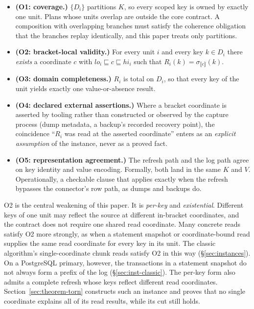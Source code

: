\documentclass[sigconf,nonacm,10pt]{acmart}
\theoremstyle{plain}
\theoremstyle{definition}
\newcommand{\den}[1]{\llbracket #1 \rrbracket}   %
\newcommand{\pre}{\sqsubseteq}                   %
\newcommand{\keys}{K}                            %
\newcommand{\vals}{V}                            %
\begin{document}
\begin{itemize}
\item \textbf{(O1: coverage.)} $\{D_i\}$ partitions $\keys$,
so every scoped key is owned by exactly one unit. Plans whose units
overlap are outside the core contract. A composition with
overlapping branches must satisfy the coherence obligation that the
branches replay identically, and this paper treats only partitions.
\item \textbf{(O2: bracket-local validity.)} For every unit $i$
and every key $k \in D_i$ there \emph{exists} a coordinate $c$ with
$lo_i \pre c \pre hi_i$ such that
$R_i(k) = \sigma_{\den{c}}(k)$.
\item \textbf{(O3: domain completeness.)} $R_i$ is total on
$D_i$, so that every key of the unit yields exactly one value-or-absence
result.
\item \textbf{(O4: declared external assertions.)} Where a
bracket coordinate is asserted by tooling rather than constructed or
observed by the capture process (dump metadata, a backup's recorded
recovery point), the coincidence ``$R_i$ was read at the asserted
coordinate'' enters as an \emph{explicit assumption} of the instance,
never as a proved fact.
\item \textbf{(O5: representation agreement.)} The refresh path
and the log path agree on key identity and value encoding.
Formally, both land in the same $\keys$ and $\vals$. Operationally,
a checkable clause that applies exactly when the refresh bypasses the
connector's row path, as dumps and backups do.
\end{itemize}

O2 is the central weakening of this paper. It is
\emph{per-key} and \emph{existential}.
Different keys of one unit may reflect the source at different in-bracket
coordinates, and the contract does not require one shared read
coordinate. Many concrete reads satisfy O2 more strongly, as when a statement
snapshot or coordinate-bound read supplies the same read coordinate for every
key in its unit. The classic algorithm's single-coordinate chunk reads
satisfy O2 in this way (\S\ref{sec:instances}). On a PostgreSQL primary,
however, the transactions in a statement snapshot do not always form a
prefix of the log (\S\ref{sec:inst-classic}). The per-key
form also admits a complete refresh whose keys reflect different read coordinates.
Section~\ref{sec:theorem-torn} constructs such an instance
and proves that no single coordinate explains all of its read results,
while its cut still holds.
\end{document}
